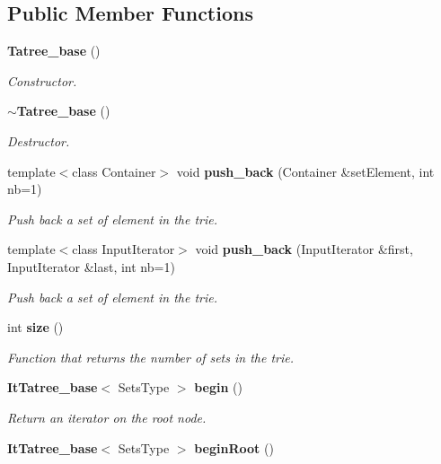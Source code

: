 \subsection*{Public Member Functions}
\begin{CompactItemize}
\item 
{\bf Tatree\_\-base} ()\label{class_tatree__base_c8206aefa793dc39fefa7d5112ac17a1}

\begin{CompactList}\small\item\em Constructor. \item\end{CompactList}\item 
{\bf $\sim$Tatree\_\-base} ()\label{class_tatree__base_0c831209dadbd62486cfcfc39864b5e7}

\begin{CompactList}\small\item\em Destructor. \item\end{CompactList}\item 
template$<$class Container$>$ void {\bf push\_\-back} (Container \&set\-Element, int nb=1)
\begin{CompactList}\small\item\em Push back a set of element in the trie. \item\end{CompactList}\item 
template$<$class Input\-Iterator$>$ void {\bf push\_\-back} (Input\-Iterator \&first, Input\-Iterator \&last, int nb=1)
\begin{CompactList}\small\item\em Push back a set of element in the trie. \item\end{CompactList}\item 
int {\bf size} ()\label{class_tatree__base_7b328d694667e2361991e7e39a911311}

\begin{CompactList}\small\item\em Function that returns the number of sets in the trie. \item\end{CompactList}\item 
{\bf It\-Tatree\_\-base}$<$ Sets\-Type $>$ {\bf begin} ()\label{class_tatree__base_5ac683d9ee2312f85017264dac63ff90}

\begin{CompactList}\small\item\em Return an iterator on the root node. \item\end{CompactList}\item 
{\bf It\-Tatree\_\-base}$<$ Sets\-Type $>$ {\bf begin\-Root} ()\label{class_tatree__base_b14eebc51ea7fc7afbfa3b1092cf093f}


\end{CompactItemize}
